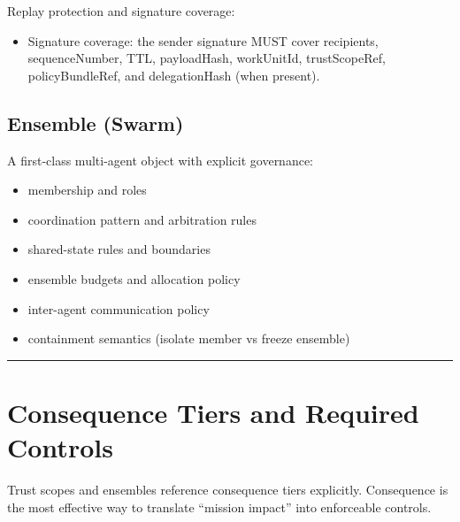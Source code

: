 \documentclass[11pt]{article}
\begin{document}
Replay protection and signature coverage:

\begin{itemize}
\tightlist
\item
  Signature coverage: the sender signature MUST cover recipients,
  sequenceNumber, TTL, payloadHash, workUnitId, trustScopeRef,
  policyBundleRef, and delegationHash (when present).
\end{itemize}

\hypertarget{ensemble-swarm}{%
\subsection{Ensemble (Swarm)}\label{ensemble-swarm}}

A first-class multi-agent object with explicit governance:

\begin{itemize}
\tightlist
\item
  membership and roles
\item
  coordination pattern and arbitration rules
\item
  shared-state rules and boundaries
\item
  ensemble budgets and allocation policy
\item
  inter-agent communication policy
\item
  containment semantics (isolate member vs freeze ensemble)
\end{itemize}

\vspace{2pt}\begin{center}\rule{0.62\linewidth}{0.6pt}\end{center}\vspace{2pt}

\hypertarget{consequence-tiers-and-required-controls}{%
\section{Consequence Tiers and Required Controls}\label{consequence-tiers-and-required-controls}}

Trust scopes and ensembles reference consequence tiers explicitly.
Consequence is the most effective way to translate ``mission impact''
into enforceable controls.
\end{document}
